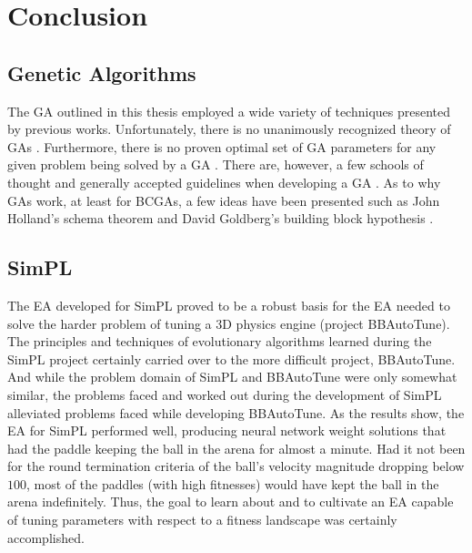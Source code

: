 \chapter{Conclusion}

\label{Chapter6}


\section{Genetic Algorithms}

The GA outlined in this thesis employed a wide variety of techniques presented by previous works. Unfortunately, there is no unanimously recognized theory of GAs \cite{Beasley93anoverview}. Furthermore, there is no proven optimal set of GA parameters for any given problem being solved by a GA \cite{ColinReeves}. There are, however, a few schools of thought and generally accepted guidelines when developing a GA \cite{ColinReeves}\cite{Beasley93anoverview}. As to why GAs work, at least for BCGAs, a few ideas have been presented such as John Holland's schema theorem and David Goldberg's building block hypothesis \cite{Beasley93anoverview}. 

\section{SimPL}


The EA developed for SimPL proved to be a robust basis for the EA needed to solve the harder problem of tuning a 3D physics engine (project BBAutoTune). The principles and techniques of evolutionary algorithms learned during the SimPL project certainly carried over to the more difficult project, BBAutoTune. And while the problem domain of SimPL and BBAutoTune were only somewhat similar, the problems faced and worked out during the development of SimPL alleviated problems faced while developing BBAutoTune. As the results show, the EA for SimPL performed well, producing neural network weight solutions that had the paddle keeping the ball in the arena for almost a minute. Had it not been for the round termination criteria of the ball's velocity magnitude dropping below $100$, most of the paddles (with high fitnesses) would have kept the ball in the arena indefinitely. Thus, the goal to learn about and to cultivate an EA capable of tuning parameters with respect to a fitness landscape was certainly accomplished. 

